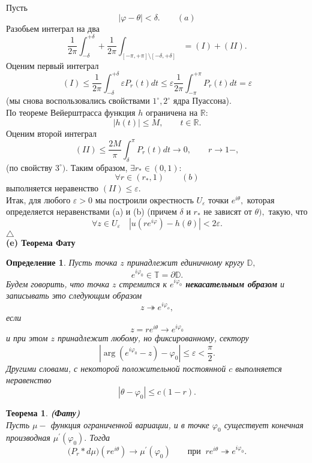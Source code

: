 \documentclass[12pt,a4paper]{article}
\theoremstyle{plain}   \newtheorem{Pro}{Задача}
\newtheorem{Def}{Определение}
\newtheorem{The}{Теорема}
\begin{document}
Пусть
$$
  |\varphi - \theta |< \delta . \qquad (a)
$$
Разобьем интеграл на два
$$
  \frac{1}{2\pi}\int _{-\delta}^{+\delta} +
  \frac{1}{2\pi} \int _{[-\pi , +\pi ] \setminus [-\delta ,+\delta ]}
  =(I) + (II).
$$
Оценим первый интеграл
$$
  (I) \leq \frac{1}{2\pi}\int _{-\delta }^{+\delta}
  \varepsilon P_r (t)dt \leq \varepsilon \frac{1}{2\pi}
  \int _{-\pi}^{+\pi}P_r (t)dt =\varepsilon
$$
(мы снова воспользовались свойствами
$ 1^{\circ}, 2^{\circ} $
ядра Пуассона).
\\
По теореме Вейерштрасса функция
$ h $
ограничена на
$ \mathbb{R} : $
$$
  |h(t)| \leq M, \qquad t \in \mathbb{R} .
$$
Оценим второй интеграл
$$
  (II) \leq \frac{2M}{\pi} \int _{\delta}^{\pi}
  P_r (t) dt \rightarrow 0 , \qquad r \rightarrow 1- ,
$$
(по свойству
$ 3^{\circ} ).$
Таким образом,
$ \exists r_{\ast} \in (0,1): $
$$
  \forall r \in (r_{\ast},1) \qquad (b)
$$
выполняется неравенство
$ (II) \leq \varepsilon . $
\\
Итак, для любого
$ \varepsilon >0 $
мы построили окрестность
$ U_{\varepsilon} $
точки
$ e^{i\theta} ,$
которая определяется неравенствами (a) и (b) (причем
$ \delta $ и $ r_{\ast} $
не зависят от
$ \theta ), $
такую, что
$$
  \forall z \in U_{\varepsilon} \quad
  |u(re^{i\varphi})-h(\theta )|<2\varepsilon .
$$
$ \triangle $
\\
{\bfseries (e) Теорема Фату}
\begin{Def}
Пусть точка
$ z $
принадлежит единичному кругу
$ \mathbb{D} , $
$$
  e^{i\varphi _0} \in \mathbb{T} =
  \partial \mathbb{D} .
$$
Будем говорить, что точка
$ z $
стремится к
$ e^{i\varphi _0} $
{\bfseries некасательным образом}
и записывать это следующим образом
$$
  z \twoheadrightarrow e^{i\varphi _o},
$$
если
$$
  z=re^{i\theta} \longrightarrow e^{i\varphi _0}
$$
и при этом
$ z $
принадлежит любому, но фиксированному, сектору
$$
  |\arg (e^{i\varphi _0}-z)-\varphi _0 | \leq \varepsilon <
  \frac{\pi}{2}.
$$
Другими словами, с некоторой положительной постоянной
$ c $
выполняется неравенство
$$
  |\theta - \varphi _0 | \leq c(1-r).
$$
\end{Def}
\begin{The}
{\bfseries (Фату)}
\\
Пусть
$ \mu - $
функция ограниченной вариации, и в точке
$ \varphi _0 $
существует конечная производная
$ \mu ^{\prime}(\varphi _0 ). $
Тогда
$$
  \biggl ( P_r \ast d\mu \biggr )
  (r e^{i\theta}) \longrightarrow
  \mu ^{\prime}(\varphi _0 )
  \qquad при \; \; re^{i\theta}
  \twoheadrightarrow e^{i\varphi _0}.
$$
\end{The}
\end{document}
